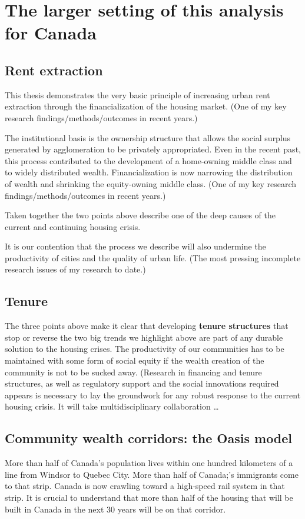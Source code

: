 \section{The larger setting of this analysis for Canada}

\subsection{Rent extraction}

This thesis demonstrates the very basic principle of increasing urban rent extraction through the financialization of the housing market. 
{\color{red}(One of my key research findings/methods/outcomes in recent years.)}
 
The institutional basis is the ownership structure that allows the social surplus generated by agglomeration to be privately appropriated. Even in the recent past, this process contributed to the development of a home-owning middle class and to widely distributed wealth. Financialization is now narrowing the distribution of wealth and shrinking the equity-owning middle class. {\color{red}(One of my key research findings/methods/outcomes in recent years.)}

Taken together the two points above describe  one of the deep causes of the current and continuing housing crisis.

It is our contention that the process we describe will also undermine the productivity of cities and the quality of urban life. {\color{red}(The most pressing incomplete research issues of my research to date.)} 



\subsection{Tenure}
The three points above make  it clear that developing \textbf{tenure structures} that stop or reverse the two big trends we highlight above are part of any durable solution to the housing crises. The productivity of our communities has to be maintained with some form of social equity if the wealth creation of the community is not to be sucked away.     {\color{red}(Research in financing and tenure structures, as well as regulatory support and the social innovations required appears is necessary to lay the groundwork for any robust response to the current housing crisis. It will take  multidisciplinary collaboration  \dots}

\subsection{Community wealth corridors: the Oasis model}
More than half of Canada's population lives within  one hundred kilometers of a line from Windsor to Quebec City. More than half of Canada;'s immigrants come to that strip. Canada is now crawling toward a high-speed rail system in that strip. It is crucial to understand that more than half of the housing that will be built in Canada in the next 30 years will be on that corridor. 

